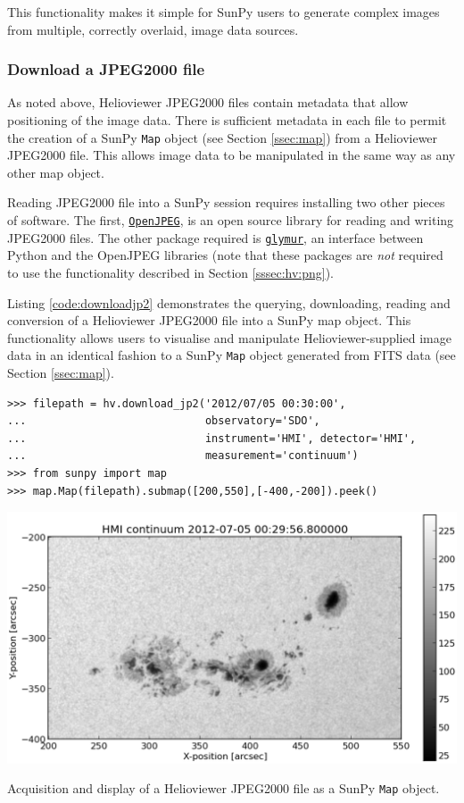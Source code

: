 This functionality makes it simple for SunPy users to generate complex
images from multiple, correctly overlaid, image data sources.

\subsubsection{Download a JPEG2000 file}\label{sssec:hv:jp}

As noted above, Helioviewer JPEG2000 files contain metadata that allow
positioning of the image data.  There is sufficient metadata in each
file to permit the creation of a SunPy \texttt{Map} object (see Section
\ref{ssec:map}) from a Helioviewer JPEG2000 file.  This allows image
data to be manipulated in the same way as any other map object.

Reading JPEG2000 file into a SunPy session requires installing two
other pieces of software. The first, 
\href{http://www.openjpeg.org}{\texttt{OpenJPEG}}, is an open
source library for reading and writing JPEG2000 files.  The other package 
required is 
\href{https://github.com/quintusdias/glymur}{\texttt{glymur}}, an
interface between Python and the OpenJPEG libraries (note that these
packages are {\it not} required to use the functionality described in
Section \ref{sssec:hv:png}).

Listing \ref{code:downloadjp2} demonstrates the querying, downloading,
reading and conversion of a Helioviewer JPEG2000 file into a SunPy map
object.  This functionality allows users to visualise and manipulate
Helioviewer-supplied image data in an identical fashion to a SunPy \texttt{Map}
object generated from FITS data (see Section \ref{ssec:map}).

\begin{listing}[H]
\begin{verbatim}
>>> filepath = hv.download_jp2('2012/07/05 00:30:00',
...                            observatory='SDO',
...                            instrument='HMI', detector='HMI', 
...                            measurement='continuum')
>>> from sunpy import map
>>> map.Map(filepath).submap([200,550],[-400,-200]).peek()
\end{verbatim}
\begin{center}
\includegraphics[width=0.8\columnwidth]{helioviewer_hmi_continuum_jp2_to_map}
\end{center}
\caption{Acquisition and display of a Helioviewer JPEG2000 file as a
  SunPy \texttt{Map} object.}
\label{code:downloadjp2}
\end{listing}
